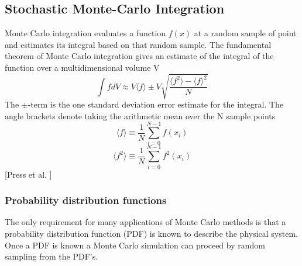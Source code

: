 \documentclass[%
reprint,
amsmath,amssymb,
aps,
]{revtex4-1}
\begin{document}
\newpage
\subsection{Stochastic Monte-Carlo Integration}
Monte Carlo integration evaluates a function $f(x)$ at a random sample of point and estimates its integral based on that random sample. The fundamental theorem of Monte Carlo integration gives an estimate of the integral of the function over a multidimensional volume V
\begin{equation}
	\int f dV \approx V \langle f\rangle \pm V\sqrt{\dfrac{ \langle f^2 \rangle - \langle f \rangle^2}{N}}
\end{equation}
The $\pm$-term is the one standard deviation error estimate for the integral. The angle brackets denote taking the arithmetic mean over the N sample points 
\begin{equation}
	\langle f \rangle \equiv \dfrac{1}{N}\sum_{i=0}^{N-1}f(x_i)
\end{equation}
\begin{equation}
\langle f^2 \rangle \equiv \dfrac{1}{N}\sum_{i=0}^{N-1}f^2(x_i)
\end{equation}
[Press et al. ]

\subsubsection{Probability distribution functions}
The only requirement for many applications of Monte Carlo methods is that a probability distribution function (PDF) is known to describe the physical system. Once a PDF is known a Monte Carlo simulation can proceed by random sampling from the PDF's. 
\end{document}
